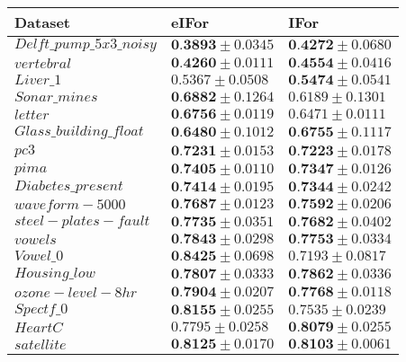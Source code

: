 \documentclass{article}
\begin{document}
\begin{tabular}{lll}
\hline
 Dataset                   & eIFor                         & IFor                          \\
\hline
 $Delft\_pump\_5x3\_noisy$ & $\textbf{0.3893}  \pm 0.0345$ & $\textbf{0.4272}  \pm 0.0680$ \\
 $vertebral$               & $\textbf{0.4260}  \pm 0.0111$ & $\textbf{0.4554}  \pm 0.0416$ \\
 $Liver\_1$                & $0.5367 \pm 0.0508$           & $\textbf{0.5474}  \pm 0.0541$ \\
 $Sonar\_mines$            & $\textbf{0.6882}  \pm 0.1264$ & $0.6189 \pm 0.1301$           \\
 $letter$                  & $\textbf{0.6756}  \pm 0.0119$ & $0.6471 \pm 0.0111$           \\
 $Glass\_building\_float$  & $\textbf{0.6480}  \pm 0.1012$ & $\textbf{0.6755}  \pm 0.1117$ \\
 $pc3$                     & $\textbf{0.7231}  \pm 0.0153$ & $\textbf{0.7223}  \pm 0.0178$ \\
 $pima$                    & $\textbf{0.7405}  \pm 0.0110$ & $\textbf{0.7347}  \pm 0.0126$ \\
 $Diabetes\_present$       & $\textbf{0.7414}  \pm 0.0195$ & $\textbf{0.7344}  \pm 0.0242$ \\
 $waveform-5000$           & $\textbf{0.7687}  \pm 0.0123$ & $\textbf{0.7592}  \pm 0.0206$ \\
 $steel-plates-fault$      & $\textbf{0.7735}  \pm 0.0351$ & $\textbf{0.7682}  \pm 0.0402$ \\
 $vowels$                  & $\textbf{0.7843}  \pm 0.0298$ & $\textbf{0.7753}  \pm 0.0334$ \\
 $Vowel\_0$                & $\textbf{0.8425}  \pm 0.0698$ & $0.7193 \pm 0.0817$           \\
 $Housing\_low$            & $\textbf{0.7807}  \pm 0.0333$ & $\textbf{0.7862}  \pm 0.0336$ \\
 $ozone-level-8hr$         & $\textbf{0.7904}  \pm 0.0207$ & $\textbf{0.7768}  \pm 0.0118$ \\
 $Spectf\_0$               & $\textbf{0.8155}  \pm 0.0255$ & $0.7535 \pm 0.0239$           \\
 $HeartC$                  & $0.7795 \pm 0.0258$           & $\textbf{0.8079}  \pm 0.0255$ \\
 $satellite$               & $\textbf{0.8125}  \pm 0.0170$ & $\textbf{0.8103}  \pm 0.0061$ \\

\end{tabular}
\end{document}
